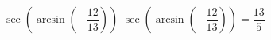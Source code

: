  {$\sec\left(\arcsin\left(-\dfrac{12}{13}\right)\right)$ }
{ $\sec\left(\arcsin\left(-\dfrac{12}{13}\right)\right) = \dfrac{13}{5}$}

